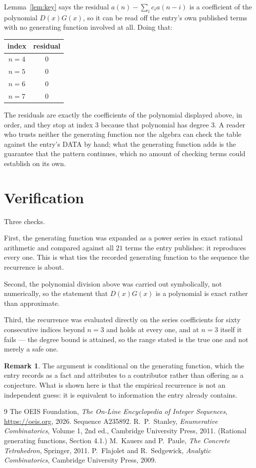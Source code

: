 \documentclass[11pt,a4paper]{article}
\theoremstyle{plain}
\theoremstyle{definition}
\newtheorem{remark}[theorem]{Remark}
\begin{document}
Lemma~\ref{lem:key} says the residual $a(n)-\sum_ic_ia(n-i)$ is a coefficient of the
polynomial $D(x)G(x)$, so it can be read off the entry's own published terms with no
generating function involved at all. Doing that:
\begin{center}
\begin{tabular}{cc}
index & residual \\ \hline
$n=4$ & $0$ \\
$n=5$ & $0$ \\
$n=6$ & $0$ \\
$n=7$ & $0$
\end{tabular}
\end{center}
The residuals are exactly the coefficients of the polynomial displayed above, in order, and
they stop at index $3$ because that polynomial has degree $3$. A reader who trusts
neither the generating function nor the algebra can check the table against the entry's DATA
by hand; what the generating function adds is the guarantee that the pattern continues, which
no amount of checking terms could establish on its own.

\section{Verification}

Three checks.

First, the generating function was expanded as a power series in exact rational arithmetic and
compared against all $21$ terms the entry publishes: it reproduces every one. This is
what ties the recorded generating function to the sequence the recurrence is about.

Second, the polynomial division above was carried out symbolically, not numerically, so the
statement that $D(x)G(x)$ is a polynomial is exact rather than approximate.

Third, the recurrence was evaluated directly on the series coefficients for sixty consecutive
indices beyond $n=3$ and holds at every one, and at $n=3$ itself it fails --- the
degree bound is attained, so the range stated is the true one and not merely a safe one.

\begin{remark}
The argument is conditional on the generating function, which the entry records as a fact and
attributes to a contributor rather than offering as a conjecture. What is shown here is that
the empirical recurrence is not an independent guess: it is equivalent to information the
entry already contains.
\end{remark}

\begin{thebibliography}{9}
 The OEIS Foundation, \emph{The On-Line Encyclopedia of Integer
Sequences}, \url{https://oeis.org}, 2026. Sequence A235892.
 R.~P.~Stanley, \emph{Enumerative Combinatorics}, Volume 1, 2nd ed.,
Cambridge University Press, 2011. (Rational generating functions, Section 4.1.)
 M.~Kauers and P.~Paule, \emph{The Concrete Tetrahedron}, Springer, 2011.
 P.~Flajolet and R.~Sedgewick, \emph{Analytic Combinatorics}, Cambridge
University Press, 2009.
\end{thebibliography}
\end{document}
